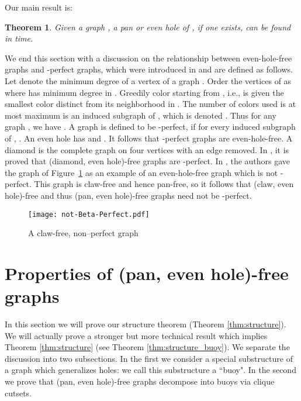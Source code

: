 \documentclass[11pt,a4paper]{article}
\newtheorem{theorem} {Theorem}[section]
\begin{document}
Our main result is:
\begin{theorem}\label{MainResult}
Given a graph , a pan or even hole of , if one exists,
can be found in  time.
\end{theorem}

We end this section with a discussion on the relationship between
even-hole-free graphs and -perfect graphs, which were
introduced in \cite{MarGas1996} and are defined as follows. Let   denote the
minimum degree of a vertex of a graph . Order the vertices of
 as  where  has minimum degree in
. Greedily color  starting from ,
i.e.,  is given the smallest color distinct from its
neighborhood in . The number of colors used
is at most maximum is an induced subgraph of
, which is denoted .  Thus for any graph , we
have . A graph is defined to be
-perfect, if for every induced subgraph  of ,
. An even hole  has  and
.  It follows that -perfect graphs
are even-hole-free.  A diamond is the complete graph on four
vertices with an edge removed. In \cite{KloMul2009}, it is proved
that (diamond, even hole)-free graphs are -perfect.  In
\cite{MarGas1996}, the authors gave the graph of
Figure~\ref{fig:non-beta-perfect} as an example of an
even-hole-free graph which is not -perfect. This graph is
claw-free and hence pan-free, so it follows that (claw, even
hole)-free and thus (pan, even hole)-free graphs need not be
-perfect.
\begin{figure}[h]
\centering
\texttt{[image: not-Beta-Perfect.pdf]}
\caption{A claw-free, non--perfect graph}
\label{fig:non-beta-perfect}
\end{figure}
\section{Properties of (pan, even hole)-free graphs}
\label{sec:properties}
In this section we will prove our structure theorem (Theorem
\ref{thm:structure}). We will actually prove a stronger but
more technical result which implies Theorem
\ref{thm:structure} (see Theorem \ref{thm:structure_buoy}).
We separate the discussion into two
subsections. In the first we consider a special substructure of a
graph which generalizes holes: we call this substructure a
``buoy". In the second we prove that (pan, even hole)-free
graphs decompose into buoys via clique cutsets.
\end{document}
